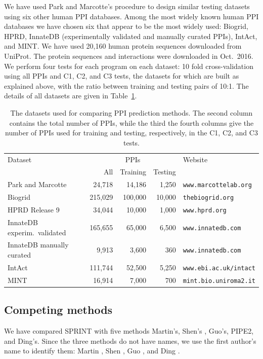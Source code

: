 We have used Park and Marcotte's procedure to design similar testing datasets using six other human PPI databases. Among the most widely known human PPI databases we have chosen six that appear to be the most widely used: Biogrid, HPRD, InnateDB (experimentally validated and manually curated PPIs), IntAct, and MINT. We have used 20,160 human protein sequences downloaded from UniProt. The protein sequences and interactions were downloaded in Oct.~2016. We perform four tests for each program on each dataset: 10 fold cross-validation using all PPIs and C1, C2, and C3 tests, the datasets for which are built as explained above, with the ratio between training and testing pairs of 10:1. The details of all datasets are given in Table~\ref{table_datasets}. 

\begin{table}
\centering
\caption[The datasets used for comparing PPI prediction methods]{The datasets used for comparing PPI prediction methods. The second column contains the total number of PPIs, while the third the fourth columns give the number of PPIs used for training and testing, respectively, in the C1, C2, and C3 tests.}
\label{table_datasets}
\begin{tabular}{@{}lrrrl@{}}
\toprule
Dataset & \multicolumn{3}{c}{PPIs} & Website  \\ \cmidrule{2-4}
	 & All & Training & Testing &  \\ \midrule
Park and Marcotte & 24,718 & 14,186 & 1,250 & \texttt{www.marcottelab.org} \\ 
Biogrid  & 215,029 & 100,000 & 10,000 & \texttt{thebiogrid.org} \\
HPRD Release 9 & 34,044 & 10,000 & 1,000 & \texttt{www.hprd.org} \\ 
InnateDB experim.~validated & 165,655 & 65,000 & 6,500 & \texttt{www.innatedb.com} \\ 
InnateDB manually curated & 9,913 &3,600 & 360 & \texttt{www.innatedb.com} \\ 
IntAct & 111,744 & 52,500 & 5,250 & \texttt{www.ebi.ac.uk/intact} \\ 
MINT & 16,914 & 7,000 & 700 & \texttt{mint.bio.uniroma2.it} \\ \bottomrule
\end{tabular}
\end{table}

\subsection{Competing methods}
We have compared SPRINT with five methods Martin's\cite{Martin05_PPIpred}, Shen's \cite{Shen07_PPIpred}, Guo's\cite{Guo08_PPIpred}, PIPE2\cite{Pitre08_PIPE2}, and Ding's\cite{ding2016predicting}.  Since the three methods do not have names, we use the first author's name to identify them: Martin \cite{Martin05_PPIpred}, Shen \cite{Shen07_PPIpred}, Guo \cite{Guo08_PPIpred}, and Ding \cite{ding2016predicting}.

